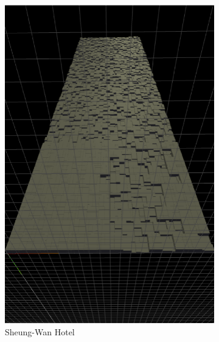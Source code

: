 \begin{figure}
\begin{subfigure}[b]{0.25\linewidth}
    \includegraphics[width=1.0\linewidth]{./images/all_examples/sheung_wan_hotel_crop}
    \caption{Sheung-Wan Hotel}
    \label{fig:ex:sheung:wan}
  \end{subfigure}
  \begin{subfigure}[b]{0.25\linewidth}

\end{subfigure}
\end{figure}
